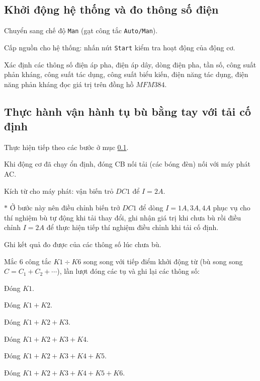 \documentclass[13pt,a4paper]{extarticle}
\begin{document}
\subsection{Khởi động hệ thống và đo thông số điện}\label{Sub:khoi-dong}
\begin{list}{--}{}
\item Chuyển sang chế độ \verb|Man| (gạt công tắc \verb|Auto/Man|).
\item Cấp nguồn cho hệ thống: nhấn nút \verb|Start| kiểm tra hoạt động của động cơ.
\item Xác định các thông số điện áp pha, điện áp dây, dòng điện pha, tần số, công suất phản kháng, công suất tác dụng, công suất biểu kiến, điện năng tác dụng, điện năng phản kháng đọc giá trị trên đồng hồ $MFM384$.
\end{list}
\subsection{Thực hành vận hành tụ bù bằng tay với tải cố định}
\begin{list}{--}{}
\item Thực hiện tiếp theo các bước ở mục \ref{Sub:khoi-dong}.
\item Khi động cơ đã chạy ổn định, đóng CB nối tải (các bóng đèn) nối với máy phát AC.
\item Kích từ cho máy phát: vận biến trỏ $DC1$ để $I = 2A$.
\item[$\ast$] Ở bước này nên điều chỉnh biến trở $DC1$ để dòng $I=1A,3A,4A$ phục vụ cho thí nghiệm bù tự động khi tải thay đổi, ghi nhận giá trị khi chưa bù rồi điều chỉnh $I=2A$ để thực hiện tiếp thí nghiệm điều chỉnh khi tải cố định.
\item Ghi kết quả đo được của các thông số lúc chưa bù.
\item Mắc 6 công tắc $K1\div K6$ song song với tiếp điểm khởi động từ (bù song song $C = C_1 + C_2 + \cdots$), lần lượt đóng các tụ và ghi lại các thông số:
\begin{list}{+}{}
\item Đóng $K1$.
\item Đóng $K1+K2$.
\item Đóng $K1+K2+K3$.
\item Đóng $K1+K2+K3+K4$.
\item Đóng $K1+K2+K3+K4+K5$.
\item Đóng $K1+K2+K3+K4+K5+K6$.
\end{list}
\end{list}
\end{document}
